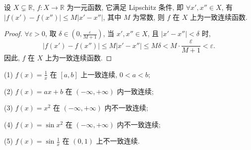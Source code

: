 \begin{example}\label{ex:2.5.8}
设 $X \subsetneq \mathbb{R}$, $f\colon X \to \mathbb{R}$ 为一元函数, 它满足 Lipschitz 条件, 即 $\forall x', x'' \in X$, 有 $|f(x') - f(x'')| \leqslant M|x' - x''|$, 其中 $M$ 为常数, 则 $f$ 在 $X$ 上为一致连续函数.
\end{example}

\begin{proof}
$\forall \varepsilon > 0$, 取 $\delta \in \left(0, \frac{\varepsilon}{M+1}\right)$, 当 $x', x'' \in X$, 且 $|x' - x''| < \delta$ 时,
\[
|f(x') - f(x'')| \leqslant M|x' - x''| \leqslant M\delta < M \cdot \frac{\varepsilon}{M+1} < \varepsilon.
\]
因此, $f$ 在 $X$ 上为一致连续函数.
\end{proof}

\begin{example}\label{ex:2.5.9}
(1) $f(x) = \frac{1}{x}$ 在 $[a,b]$ 上一致连续, $0 < a < b$;

(2) $f(x) = ax + b$ 在 $(-\infty, +\infty)$ 内一致连续;

(3) $f(x) = x^2$ 在 $(-\infty, +\infty)$ 内不一致连续;

(4) $f(x) = \sin x^2$ 在 $(-\infty, +\infty)$ 内不一致连续;

(5) $f(x) = \sin \frac{1}{x}$ 在 $(0,1)$ 上不一致连续.
\end{example}

